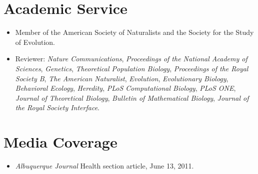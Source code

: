 \documentclass[11pt]{article}
\begin{document}

  \section{Academic Service}
  \begin{itemize}
  \item Member of the American Society of Naturalists and the Society for the Study of Evolution.
  \item Reviewer: \textit{Nature Communications}, \textit{Proceedings of the National Academy of Sciences}, \textit{Genetics}, \textit{Theoretical Population Biology}, \textit{Proceedings of the Royal Society B}, \textit{The American Naturalist}, \textit{Evolution}, \textit{Evolutionary Biology}, \textit{Behavioral Ecology}, \textit{Heredity}, \textit{PLoS Computational Biology}, \textit{PLoS ONE}, \textit{Journal of Theoretical Biology}, \textit{Bulletin of Mathematical Biology}, \textit{Journal of the Royal Society Interface}.
  \end{itemize}
  

  \section{Media Coverage}
  \begin{itemize}
  \item \textit{Albuquerque Journal} Health section article, June 13, 2011.
  \end{itemize}


  \pagestyle{fancy}
\end{document}
